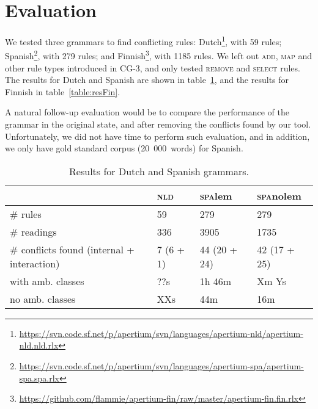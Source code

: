 \section{Evaluation}
\label{sec:eval}

We tested three grammars to find conflicting rules: 
Dutch\footnote{\scriptsize{\url{https://svn.code.sf.net/p/apertium/svn/languages/apertium-nld/apertium-nld.nld.rlx}}},
with 59 rules; 
Spanish\footnote{\scriptsize{\url{https://svn.code.sf.net/p/apertium/svn/languages/apertium-spa/apertium-spa.spa.rlx}}},
with 279 rules; and 
Finnish\footnote{\scriptsize{\url{https://github.com/flammie/apertium-fin/raw/master/apertium-fin.fin.rlx}}},
with 1185 rules. We left out \textsc{add}, \textsc{map} and other rule
types introduced in CG-3, and only tested \textsc{remove} and \textsc{select} rules.
The results for Dutch and Spanish are shown in table~\ref{table:res},
and the results for Finnish in table~\ref{table:resFin}.

A natural follow-up evaluation would be to compare the performance of the
grammar in the original state, and after removing the conflicts found
by our tool. Unfortunately, we did not have time to perform such
evaluation, and in addition, we only have gold standard corpus (20~000~words) for Spanish.



\begin{table}[]
\centering
\begin{tabular}{|p{2.8125cm}|l|l|l|}

\hline
                   & \textsc{nld}  & \textsc{spa}lem  & \textsc{spa}nolem \\ \hline
\# rules           & 59            & 279       & 279     \\ \hline
\# readings        & 336           & 3905      & 1735    \\ \hline
\# conflicts found \small{(internal + interaction)}
                   & 7 (6 + 1)     & 44 (20 + 24)     & 42 (17 + 25) \\ \hline

\clock{} with amb. 
           classes & ??s           & 1h 46m    &  Xm Ys  \\ \hline

\clock{} no amb. 
           classes & XXs        & 44m       & 16m      \\ \hline 


\end{tabular}
\caption{Results for Dutch and Spanish grammars.}
\label{table:res}
\end{table}





